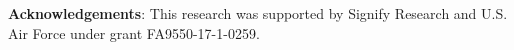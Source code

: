 \documentclass{article}
\begin{document}
\noindent\textbf{Acknowledgements}: This research was supported by Signify Research and U.S. Air Force under grant FA9550-17-1-0259.





\end{document}
